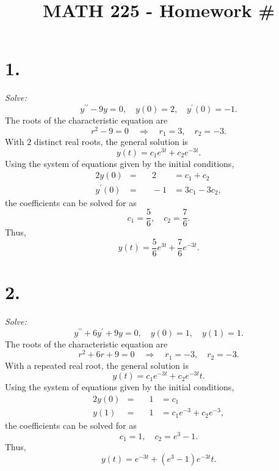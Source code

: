 \documentclass[12pt]{article}
\title{\vspace{-2\baselineskip}MATH 225 - Homework \#\HOMEWORKNUM}
\author{\NAME}
\date{\DATE}
\begin{document}
\maketitle

\section*{1.}
\textit{Solve:}
\begin{equation*}
	y^{\prime\prime} - 9y = 0, \quad
	y(0) = 2, \quad
	y^\prime(0) = -1.
\end{equation*}
The roots of the characteristic equation are
\begin{equation*}
	r^2 - 9 = 0 \quad \Rightarrow \quad r_1 = 3, \quad r_2 = -3.
\end{equation*}
With $2$ distinct real roots, the general solution is
\begin{equation*}
	y(t) = c_1 e^{3 t} + c_2 e^{-3 t}.
\end{equation*}
Using the system of equations given by the initial conditions,
\begin{alignat*}{2}
	y(0) &=& \quad 2 &= c_1 + c_2 \\
	y^\prime(0) &=& \quad -1 &= 3 c_1 - 3 c_2,
\end{alignat*}
the coefficients can be solved for as
\begin{equation*}
	c_1 = \frac{5}{6}, \quad
	c_2 = \frac{7}{6}.
\end{equation*}
Thus,
\begin{equation*}
	\boxed{
		y(t) = \frac{5}{6} e^{3 t} + \frac{7}{6} e^{-3 t}
	}.
\end{equation*}

\section*{2.}
\textit{Solve:}
\begin{equation*}
	y^{\prime\prime} + 6y^\prime + 9y = 0, \quad
	y(0) = 1, \quad
	y(1) = 1.
\end{equation*}
The roots of the characteristic equation are
\begin{equation*}
	r^2 + 6r + 9 = 0 \quad \Rightarrow \quad r_1 = -3, \quad r_2 = -3.
\end{equation*}
With a repeated real root, the general solution is
\begin{equation*}
	y(t) = c_1 e^{-3 t} + c_2 e^{-3 t} t.
\end{equation*}
Using the system of equations given by the initial conditions,
\begin{alignat*}{2}
	y(0) &=& \quad 1 &= c_1 \\
	y(1) &=& \quad 1 &= c_1 e^{-3} +  c_2 e^{-3},
\end{alignat*}
the coefficients can be solved for as
\begin{equation*}
	c_1 = 1, \quad
	c_2 = e^3 - 1.
\end{equation*}
Thus,
\begin{equation*}
	\boxed{
		y(t) = e^{-3 t} + (e^3 - 1) e^{-3 t} t
	}.
\end{equation*}
\end{document}
